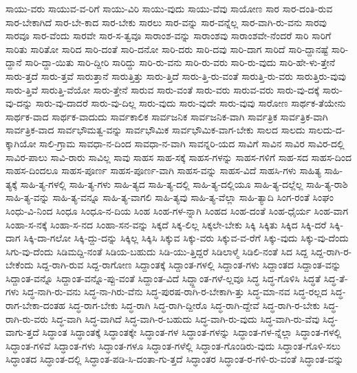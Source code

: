 {ಸಾಯು-ವರು
ಸಾಯುವ-ವ-ರಿಗೆ
ಸಾಯು-ವಿರಿ
ಸಾಯು-ವುದು
ಸಾಯು-ವೆವು
ಸಾಯೋಣ
ಸಾರ
ಸಾರ-ದಂತಿ-ರುವ
ಸಾರ-ಬೇಕಾಗಿದೆ
ಸಾರ-ಬೇ-ಕಾದ
ಸಾರ-ಬೇಕು
ಸಾರಲು
ಸಾರ-ವನ್ನು
ಸಾರ-ವನ್ನೆಲ್ಲ
ಸಾರ-ವಾಗಿ-ರು-ವನು
ಸಾರವು
ಸಾರವೂ
ಸಾರ-ವೆಂದು
ಸಾರವೇ
ಸಾರ-ಸ-ತ್ವವೂ
ಸಾರಾಂಶ-ವನ್ನು
ಸಾರಾಂಶವು
ಸಾರಾಂಶವೇ-ನೆಂದರೆ
ಸಾರಿ
ಸಾರಿಗೆ
ಸಾರಿತು
ಸಾರಿತೋ
ಸಾರಿದ
ಸಾರಿ-ದಂತೆ
ಸಾರಿ-ದನೋ
ಸಾರಿ-ದರು
ಸಾರಿ-ದವು
ಸಾರಿ-ದಾಗ
ಸಾರಿದೆ
ಸಾರಿ-ದ್ದಾನಷ್ಟೆ
ಸಾರಿ-ದ್ದಾನೆ
ಸಾರಿ-ದ್ದಾ-ಯಿತು
ಸಾರಿ-ದ್ದೀರಿ
ಸಾರಿದ್ದು
ಸಾರಿ-ರು-ವನು
ಸಾರಿ-ರು-ವರು
ಸಾರಿ-ರು-ವುದು
ಸಾರಿ-ಹೇ-ಳು-ತ್ತೇನೆ
ಸಾರು-ತ್ತದೆ
ಸಾರು-ತ್ತವೆ
ಸಾರುತ್ತಾನೆ
ಸಾರುತ್ತಿತ್ತು
ಸಾರು-ತ್ತಿದೆ
ಸಾರು-ತ್ತಿ-ರು-ವಂತೆ
ಸಾರುತ್ತಿ-ರು-ವರು
ಸಾರುತ್ತಿರು-ವುವು
ಸಾರು-ತ್ತಿವೆ
ಸಾರುತ್ತಿ-ವೆಯೋ
ಸಾರು-ತ್ತೇನೆ
ಸಾರುವ
ಸಾರು-ವಂತೆ
ಸಾರು-ವರು
ಸಾರುವ-ವರು
ಸಾರು-ವು-ದಕ್ಕೆ
ಸಾರು-ವು-ದನ್ನು
ಸಾರು-ವು-ದಾದರೆ
ಸಾರು-ವು-ದಿಲ್ಲ
ಸಾರು-ವುದು
ಸಾರು-ವುದೇ
ಸಾರು-ವುವು
ಸಾರೋಣ
ಸಾರ್ಥಕ-ತೆಯೇನು
ಸಾರ್ಥಕ-ವಾದ
ಸಾರ್ಥಕ-ವಾದುದು
ಸಾರ್ವಕಾಲಿಕ
ಸಾರ್ವಜನಿಕ
ಸಾರ್ವಜನಿಕ-ವಾಗಿ
ಸಾರ್ವತ್ರಿಕ
ಸಾರ್ವತ್ರಿಕ-ವಾಗಿ
ಸಾರ್ವತ್ರಿಕ-ವಾದ
ಸಾರ್ವಭೌಮತ್ವ-ವನ್ನು
ಸಾರ್ವಭೌಮಿಕ
ಸಾರ್ವಭೌಮಿಕ-ವಾಗ-ಬೇಕು
ಸಾಲದ
ಸಾಲದು
ಸಾಲದು-ದ-ಕ್ಕಾಗಿಯೋ
ಸಾಲಿ-ಗ್ರಾಮ
ಸಾವಧಾ-ನ-ದಿಂದ
ಸಾವಧಾ-ನ-ವಾಗಿ
ಸಾವನ್ನರಿ-ಯದ
ಸಾವಿಗೆ
ಸಾವಿನ
ಸಾವಿರ
ಸಾವಿರ-ದಲ್ಲಿ
ಸಾವಿರ-ಪಾಲು
ಸಾವಿ-ರಾರು
ಸಾವಿಲ್ಲ
ಸಾವು
ಸಾಹಸ
ಸಾಹ-ಸಕ್ಕೆ
ಸಾಹಸ-ಗಳನ್ನು
ಸಾಹಸ-ಗಳಿಗೆ
ಸಾಹ-ಸದ
ಸಾಹಸ-ದಿಂದ
ಸಾಹಸ-ದಿಂದಲೂ
ಸಾಹಸ-ಪೂರ್ಣ
ಸಾಹಸ-ಪೂರ್ಣ-ವಾಗಿ
ಸಾಹಸ-ವನ್ನು
ಸಾಹಸ-ವಿದೆ
ಸಾಹಸಿ-ಗಳು
ಸಾಹಿತ್ಯ
ಸಾಹಿ-ತ್ಯಕ್ಕೆ
ಸಾಹಿ-ತ್ಯ-ಗಳಲ್ಲಿ
ಸಾಹಿ-ತ್ಯ-ಗಳು
ಸಾಹಿ-ತ್ಯದ
ಸಾಹಿ-ತ್ಯ-ದಲ್ಲಿ
ಸಾಹಿ-ತ್ಯ-ದಲ್ಲಿಯೂ
ಸಾಹಿ-ತ್ಯ-ದಲ್ಲೆಲ್ಲ
ಸಾಹಿ-ತ್ಯ-ರಾಶಿ
ಸಾಹಿ-ತ್ಯ-ವನ್ನು
ಸಾಹಿ-ತ್ಯ-ವನ್ನೂ
ಸಾಹಿ-ತ್ಯ-ವಾಗಲಿ
ಸಾಹಿ-ತ್ಯವು
ಸಾಹಿ-ತ್ಯ-ವೆಲ್ಲಾ
ಸಾಹಿ-ತ್ಯಾದಿ
ಸಿಂಗ-ರಂತೆ
ಸಿಂಘಂ
ಸಿಂಧು-ವಿ-ನಿಂದ
ಸಿಂಧೂ
ಸಿಂಧೂ-ನ-ದಿಯ
ಸಿಂಹ
ಸಿಂಹ-ಗಳ-ನ್ನಾಗಿ
ಸಿಂಹದ
ಸಿಂಹ-ದಂತೆ
ಸಿಂಹ-ಧೈರ್ಯ
ಸಿಂಹ-ವಾಗ
ಸಿಂಹಾ-ಸ-ನಕ್ಕೆ
ಸಿಂಹಾ-ಸ-ನದ
ಸಿಂಹಾ-ಸನ-ವನ್ನು
ಸಿಕ್ಕದೆ
ಸಿಕ್ಕ-ಲಿಲ್ಲ
ಸಿಕ್ಕಲೇ-ಬೇಕು
ಸಿಕ್ಕಿ
ಸಿಕ್ಕಿತು
ಸಿಕ್ಕಿದ
ಸಿಕ್ಕಿ-ದರೆ
ಸಿಕ್ಕಿ-ದಾಗ
ಸಿಕ್ಕಿ-ದಾ-ಗಲೋ
ಸಿಕ್ಕಿ-ದ್ದು-ದನ್ನು
ಸಿಕ್ಕಿಲ್ಲ
ಸಿಕ್ಕಿಸಿ
ಸಿಕ್ಕುವ
ಸಿಕ್ಕು-ವರು
ಸಿಕ್ಕುವ-ವ-ರೆಗೆ
ಸಿಕ್ಕು-ವುದು
ಸಿಕ್ಕು-ವು-ದೆಂದು
ಸಿಗು-ವು-ದೆಂದು
ಸಿಡಿಮದ್ದಿ-ನಂತೆ
ಸಿಡಿಯ-ಬಹುದು
ಸಿಡಿ-ಯು-ತ್ತಿದ್ದರೆ
ಸಿಡಿಲಾಳ್ಮೆ
ಸಿಡಿಲಿ-ನಂತೆ
ಸಿದ
ಸಿದ್ದ
ಸಿದ್ದ-ರಾಗಿ-ರ-ಬೇಕೆಂದು
ಸಿದ್ದ-ರಾಗಿ-ರುವ
ಸಿದ್ದ-ರಾಗೋಣ
ಸಿದ್ದಾಂತಕ್ಕೆ
ಸಿದ್ದಾಂತ-ಗಳಲ್ಲಿ
ಸಿದ್ದಾಂತ-ಗಳು
ಸಿದ್ದಾಂತದ
ಸಿದ್ದಾಂತ-ವನ್ನು
ಸಿದ್ದಾಂತ-ವನ್ನೊ
ಸಿದ್ದಾಂತ-ವನ್ನೊ-ಪ್ಪು-ವಂತೆ
ಸಿದ್ದಾಂತ-ವಿದೆ
ಸಿದ್ದ್ದಾಂತ-ಗಳೆ-ಲ್ಲವೂ
ಸಿದ್ಧ
ಸಿದ್ಧ-ಗೊಳಿಸಿ
ಸಿದ್ಧತೆ
ಸಿದ್ಧ-ತೆ-ಗಳು
ಸಿದ್ಧ-ನಾಗಿ-ರು-ವನು
ಸಿದ್ಧ-ನಾ-ಗಿರು-ವೆನು
ಸಿದ್ಧ-ಪುರಷ-ರಾಗಿ-ರ-ಬೇಕಾಗಿ-ತ್ತು
ಸಿದ್ಧ-ಮಾ-ನವ
ಸಿದ್ಧ-ರಲ್ಲದ
ಸಿದ್ಧ-ರಾಗ-ಬೇಕಾ-ದಂತಹ
ಸಿದ್ಧ-ರಾಗ-ಬೇಕು
ಸಿದ್ಧ-ರಾಗಿ
ಸಿದ್ಧ-ರಾಗಿ-ದ್ದೀರೊ
ಸಿದ್ಧ-ರಾಗಿ-ದ್ದೇವೆ
ಸಿದ್ಧ-ರಾಗಿ-ರ-ಬೇಕು
ಸಿದ್ಧ-ರಾಗಿ-ರು-ವರು
ಸಿದ್ಧ-ವಾಗಿ
ಸಿದ್ಧ-ವಾಗಿದೆ
ಸಿದ್ಧ-ವಾಗಿ-ರ-ಬಹುದು
ಸಿದ್ಧ-ವಾಗಿ-ರು-ವುದು
ಸಿದ್ಧ-ವಾಗಿ-ರು-ವೆವು
ಸಿದ್ಧ-ವಾಗು-ತ್ತದೆ
ಸಿದ್ಧಾಂತ
ಸಿದ್ಧಾಂತಕ್ಕೆ
ಸಿದ್ಧಾಂತಕ್ಕೇ
ಸಿದ್ಧಾಂತ-ಗಳ
ಸಿದ್ಧಾಂತ-ಗಳನ್ನು
ಸಿದ್ಧಾಂತ-ಗಳ-ನ್ನೆಲ್ಲಾ
ಸಿದ್ಧಾಂತ-ಗಳಲ್ಲಿ
ಸಿದ್ಧಾಂತ-ಗಳಿವೆ
ಸಿದ್ಧಾಂತ-ಗಳು
ಸಿದ್ಧಾಂತ-ಗಳೂ
ಸಿದ್ಧಾಂತ-ಗಳೆಲ್ಲಿ
ಸಿದ್ಧಾಂತ-ಗೊಂಡಿರು-ವುದು
ಸಿದ್ಧಾಂತ-ಗೊಳಿ-ಸಲು
ಸಿದ್ಧಾಂತದ
ಸಿದ್ಧಾಂತ-ದಲ್ಲಿ
ಸಿದ್ಧಾಂತ-ಪಡಿ-ಸಿ-ದಂತಾ-ಗು-ತ್ತದೆ
ಸಿದ್ಧಾಂತರ
ಸಿದ್ಧಾಂತ-ರ-ಗಳಿ-ರು-ವಂತೆ
ಸಿದ್ಧಾಂತ-ವನ್ನು
}
